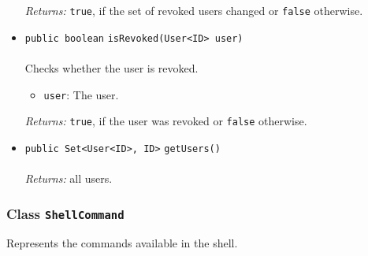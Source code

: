 \begin{itemize}
\emph{Returns:} \lstinline|true|, if the set of revoked users changed or \lstinline|false| otherwise.

\item \lstinline|public boolean| \lstinline|isRevoked|\lstinline|(User<ID> user)|\\ \\[-0.6em]
Checks whether the user is revoked.
\begin{itemize}
\item \lstinline|user|: The user.
\end{itemize}

\emph{Returns:} \lstinline|true|, if the user was revoked or \lstinline|false| otherwise.

\item \lstinline|public Set<User<ID>, ID>| \lstinline|getUsers|\lstinline|()|\\ \\[-0.6em]
\emph{Returns:} all users.



\end{itemize}

\subsubsection{Class \lstinline|ShellCommand|}
Represents the commands available in the shell. \\
\noindent\begin{minipage}[t]{5cm}
\vspace{0.3em}
\hspace*{2em}
\vspace{0.3em}
\end{minipage}





